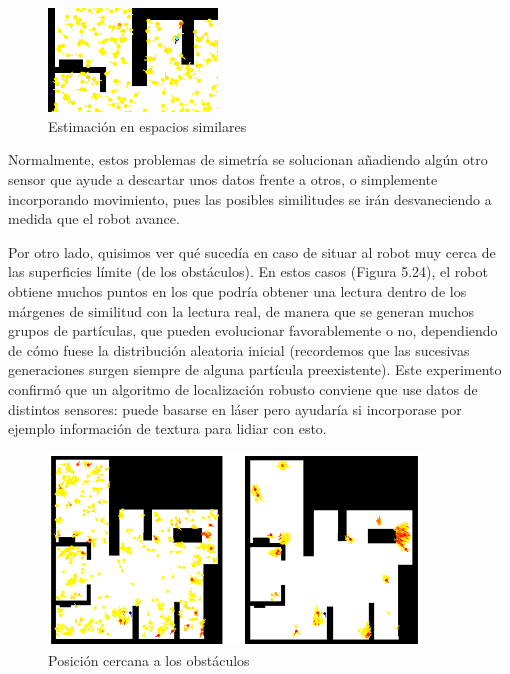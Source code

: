 \begin{figure}[H]
	\begin{center}
		\includegraphics[width=0.4\textwidth]{figures/similaroutput.png}
		\caption{Estimación en espacios similares}
		\label{fig.similaroutput}
		\end{center}
\end{figure}

Normalmente, estos problemas de simetría se solucionan añadiendo algún otro sensor que ayude a descartar unos datos frente a otros, o simplemente incorporando movimiento, pues las posibles similitudes se irán desvaneciendo a medida que el robot avance.

Por otro lado, quisimos ver qué sucedía en caso de situar al robot muy cerca de las superficies límite (de los obstáculos). En estos casos (Figura 5.24), el robot obtiene muchos puntos en los que podría obtener una lectura dentro de los márgenes de similitud con la lectura real, de manera que se generan muchos grupos de partículas, que pueden evolucionar favorablemente o no, dependiendo de cómo fuese la distribución aleatoria inicial (recordemos que las sucesivas generaciones surgen siempre de alguna partícula preexistente). Este experimento confirmó que un algoritmo de localización robusto conviene que use datos de distintos sensores: puede basarse en láser pero ayudaría si incorporase por ejemplo información de textura para lidiar con esto.

\begin{figure}[H]
	\begin{center}
		\includegraphics[width=0.88\textwidth]{figures/estampado.png}
		\caption{Posición cercana a los obstáculos}
		\label{fig.estampado}
		\end{center}
\end{figure}

